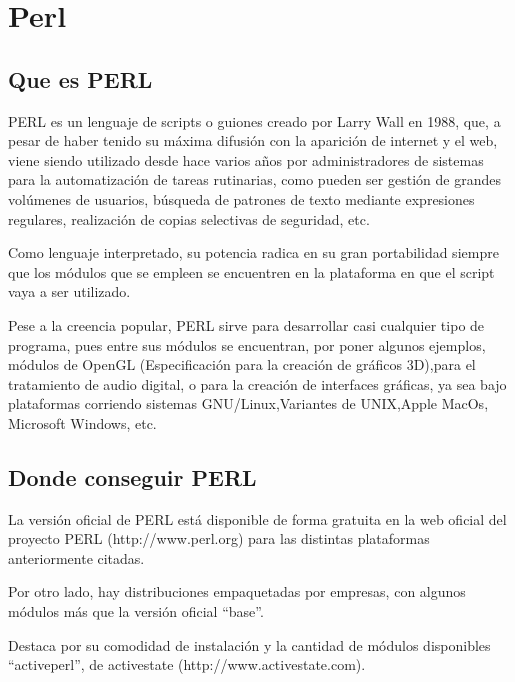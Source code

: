
\chapter{Perl}

\section{Que es PERL}

PERL es un lenguaje de scripts o guiones creado por Larry Wall en 1988, que, a pesar de haber tenido su máxima difusión con la aparición de internet y el web, viene siendo utilizado desde hace varios años por administradores de sistemas para la automatización de tareas rutinarias, como pueden ser gestión de grandes volúmenes de usuarios, búsqueda de patrones de texto mediante expresiones regulares, realización de copias selectivas de seguridad, etc.


Como lenguaje interpretado, su potencia radica en su gran portabilidad siempre que los módulos que se empleen se encuentren en la plataforma en que el script vaya a ser utilizado.

Pese a la creencia popular, PERL sirve para desarrollar casi cualquier tipo de programa, pues entre sus módulos se encuentran, por poner algunos ejemplos, módulos de OpenGL (Especificación para la creación de gráficos 3D),para el tratamiento de audio digital, o para la creación de interfaces gráficas, ya sea bajo plataformas corriendo sistemas GNU/Linux,Variantes de UNIX,Apple MacOs, Microsoft Windows, etc.

\section{Donde conseguir PERL}

La versión oficial de PERL está disponible de forma gratuita en la web oficial del proyecto PERL (http://www.perl.org) para las distintas plataformas anteriormente citadas.

Por otro lado, hay distribuciones empaquetadas por empresas, con algunos módulos más que la versión oficial ``base''.

Destaca por su comodidad de instalación y la cantidad de módulos disponibles ``activeperl'', de activestate (http://www.activestate.com).

